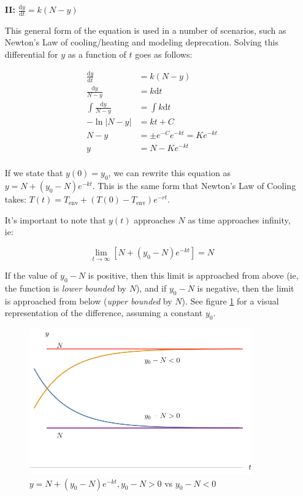 \documentclass[12pt]{article}
\begin{document}
\begin{itemize}
    \item[\textbf{II:}] $\frac{\text{d}y}{\text{d}t} = k(N-y)$ 
    
    This general form of the equation is used in a number of scenarios, such as Newton's Law of cooling/heating and modeling deprecation. Solving this differential for $y$ as a function of $t$ goes as follows:
    
    \begin{equation}
        \begin{split}
            \frac{\text{d}y}{\text{d}t} &= k(N-y)\\
            \frac{\text{d}y}{N-y} &= k \text{d}t  \\
            \int \frac{\text{d}y}{N-y} &= \int k \text{d}t\\
            - \ln|N-y| &= kt + C\\
            N-y &= \pm e^{-C}e^{-kt} = Ke^{-kt}\\
            y &= N-Ke^{-kt}\\
        \end{split}
    \end{equation}
    
    If we state that $y(0) = y_0$, we can rewrite this equation as $y = N+(y_0-N)e^{-kt}$. This is the same form that Newton's Law of Cooling takes: $T(t) = T_{\text{env}} + (T(0) - T_{\text{env}})e^{-rt}$.
    
    It's important to note that $y(t)$ approaches $N$ as time approaches infinity, ie:
    
    $$\lim_{t\to\infty} [N+(y_0-N)e^{-kt}] = N$$
    
    If the value of $y_0-N$ is positive, then this limit is approached from above (ie, the function is \textit{lower bounded} by $N$), and if $y_0-N$ is negative, then the limit is approached from below (\textit{upper bounded} by $N$). See figure \ref{fig:newtonscooling} for a visual representation of the difference, assuming a constant $y_0$.
    
    \begin{figure}[!ht]
        \centering
        \includegraphics[width=9.6cm]{misc/newtonscooling.png}
        \caption{$y=N+(y_0-N)e^{-kt}, y_0-N > 0$ vs $y_0-N < 0$}
        \label{fig:newtonscooling}
    \end{figure}
    

\end{itemize}
\end{document}
